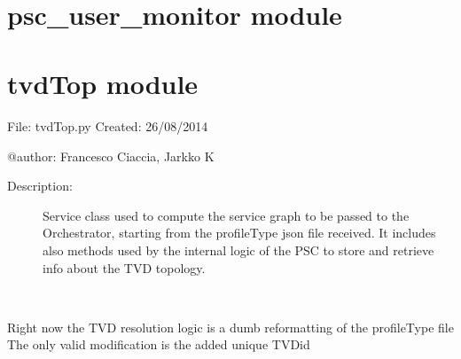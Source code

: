 \documentclass[letterpaper,10pt,oneside]{sphinxmanual}
\begin{document}
\begin{fulllineitems}
\label{psc_manager:psc_manager.psaManager}~

\begin{fulllineitems}
\label{psc_manager:psc_manager.psaManager.get_client_address}
\end{fulllineitems}


\begin{fulllineitems}
\label{psc_manager:psc_manager.psaManager.on_get}
\end{fulllineitems}


\end{fulllineitems}



\chapter{psc\_user\_monitor module}
\label{psc_user_monitor::doc}\label{psc_user_monitor:psc-user-monitor-module}

\chapter{tvdTop module}
\label{tvdTop:tvdtop-module}\label{tvdTop:module-tvdTop}\label{tvdTop::doc}
File:       tvdTop.py
Created:    26/08/2014

@author:    Francesco Ciaccia, Jarkko K
\begin{description}
\item[{Description:}] \leavevmode
Service class used to compute the service graph to be passed to the Orchestrator, 
starting from the profileType json file received.
It includes also methods used by the internal logic of the PSC to store and retrieve info about
the TVD topology.

\end{description}

\begin{fulllineitems}
\label{tvdTop:tvdTop.tvdTop}~

\begin{fulllineitems}
\label{tvdTop:tvdTop.tvdTop.resolveTVDtop}
Right now the TVD resolution logic is a dumb reformatting of the profileType file
The only valid modification is the added unique TVDid

\end{fulllineitems}


\end{fulllineitems}
\end{document}
